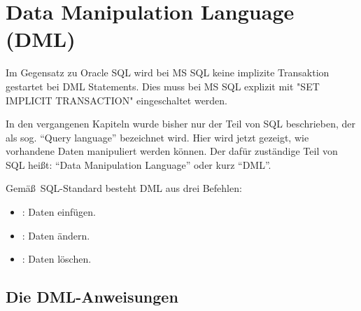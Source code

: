   \chapter{Data Manipulation Language (DML)}
  \chaptertoc{}
  \cleardoubleevenpage
  \begin{merke}
    Im Gegensatz zu Oracle SQL wird bei MS SQL keine implizite Transaktion gestartet
    bei DML Statements. Dies muss bei MS SQL explizit mit "SET IMPLICIT TRANSACTION" eingeschaltet werden.
  \end{merke}
      In den vergangenen Kapiteln wurde bisher nur der Teil von SQL beschrieben,
      der als sog. \enquote{Query language} bezeichnet wird. Hier wird jetzt
      gezeigt, wie vorhandene Daten manipuliert werden können. Der dafür
      zuständige Teil von SQL heißt: \enquote{Data Manipulation Language}
      oder kurz \enquote{DML}.

Gemä\ss\ SQL-Standard besteht DML aus drei Befehlen:
\begin{itemize}
    \item \INSERT: Daten einfügen.
    \item \UPDATE: Daten ändern.
    \item \DELETE: Daten löschen.
\end{itemize}
\section{Die DML-Anweisungen}
